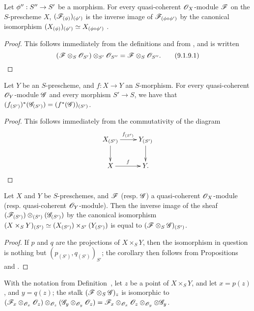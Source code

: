 \begin{proposition}[9.1.9]
\label{1.9.1.9}
Let $\vphi'':S''\to S'$ be a morphism.
For every quasi-coherent $\mathscr{O}_X$-module $\mathscr{F}$ on the $S$-prescheme $X$,
$(\mathscr{F}_{(\phi)})_{(\phi')}$ is the inverse image of
$\mathscr{F}_{(\phi\circ\phi')}$ by the canonical isomorphism
$(X_{(\phi)})_{(\phi')}\simeq X_{(\phi\circ\phi')}$
.
\end{proposition}

\begin{proof}
\label{proof-1.9.1.9}
This follows immediately from the definitions and from , and is
written
\[
\label{eq:1.9.1.9.1}
  (\mathscr{F}\otimes_S\mathscr{O}_{S'})\otimes_{S'}\mathscr{O}_{S''}=\mathscr{F}\otimes_S\mathscr{O}_{S''}.
  \tag{9.1.9.1}
\]
\end{proof}

\begin{proposition}[9.1.10]
\label{1.9.1.10}
Let $Y$ be an $S$-prescheme, and $f:X\to Y$ an $S$-morphism.
For every quasi-coherent $\mathscr{O}_Y$-module $\mathscr{G}$ and every morphism
$S'\to S$, we have that
$(f_{(S')})^*(\mathscr{G}_{(S')})=(f^*(\mathscr{G}))_{(S')}$.
\end{proposition}

\begin{proof}
\label{proof-1.9.1.10}
This follows immediately from the commutativity of the diagram
\[
  \xymatrix{
    X_{(S')}\ar[r]^{f_{(S')}}\ar[d] &
    Y_{(S')}\ar[d]\\
    X\ar[r]^f &
    Y.
  }
\]
\end{proof}

\begin{corollary}[9.1.11]
\label{1.9.1.11}
Let $X$ and $Y$ be $S$-preschemes, and
$\mathscr{F}$ (resp. $\mathscr{G}$) a quasi-coherent $\mathscr{O}_X$-module
(resp. quasi-coherent $\mathscr{O}_Y$-module). Then the inverse image of the sheaf
$(\mathscr{F}_{(S')})\otimes_{(S')}(\mathscr{G}_{(S')})$ by the canonical isomorphism
$(X\times_S Y)_{(S')}\simeq(X_{(S')})\times_{S'}(Y_{(S')})$
 is equal to $(\mathscr{F}\otimes_S\mathscr{G})_{(S')}$.
\end{corollary}

\begin{proof}
\label{proof-1.9.1.11}
If $p$ and $q$ are the projections of $X\times_S Y$, then the isomorphism in question
is nothing but $(p_{(S')}, q_{(S')})_{S'}$; the corollary then follows from
Propositions~ and .
\end{proof}

\begin{proposition}[9.1.12]
\label{1.9.1.12}
With the notation from Definition~, let $z$ be
a point of $X\times_S Y$, and let $x=p(z)$, and $y=q(z)$; the stalk
$(\mathscr{F}\otimes_S\mathscr{G})_z$ is isomorphic to
$(\mathscr{F}_x\otimes_{\mathscr{O}_x}\mathscr{O}_z)\otimes_{\mathscr{O}_z}(\mathscr{G}_y\otimes_{\mathscr{O}_y}\mathscr{O}_z)
  =\mathscr{F}_x\otimes_{\mathscr{O}_x}\mathscr{O}_z\otimes_{\mathscr{O}_y}\otimes\mathscr{G}_y$.
\end{proposition}

